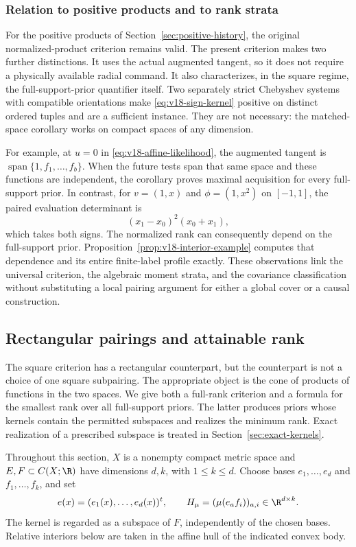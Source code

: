 \subsubsection{Relation to positive products and to rank strata}
For the positive products of Section~\ref{sec:positive-history}, the
original normalized-product criterion remains valid. The present
criterion makes two further distinctions. It uses the actual augmented
tangent, so it does not require a physically available radial command.
It also characterizes, in the square regime, the full-support-prior
quantifier itself. Two separately strict Chebyshev systems with compatible
orientations make \eqref{eq:v18-sign-kernel} positive on distinct ordered
tuples and are a sufficient instance. They are not necessary: the
matched-space corollary works on compact spaces of any dimension.

For example, at $u=0$ in \eqref{eq:v18-affine-likelihood}, the augmented
tangent is $\operatorname{span}\{1,f_1,\ldots,f_b\}$. When the future
tests span that same space and these functions are independent, the
corollary proves maximal acquisition for every full-support prior.
In contrast, for $v=(1,x)$ and $\phi=(1,x^2)$ on $[-1,1]$, the paired
evaluation determinant is
\[
 (x_1-x_0)^2(x_0+x_1),
\]
which takes both signs. The normalized rank can consequently depend on
the full-support prior. Proposition~\ref{prop:v18-interior-example}
computes that dependence and its entire finite-label profile exactly.
These observations link the universal criterion, the algebraic moment
strata, and the covariance classification without substituting a local
pairing argument for either a global cover or a causal construction.


\subsection{Rectangular pairings and attainable rank}
\label{sec:v19-rectangular}
The square criterion has a rectangular counterpart, but the counterpart
is not a choice of one square subpairing. The appropriate object is
the cone of products of functions in the two spaces. We give both a
full-rank criterion and a formula for the smallest rank over all
full-support priors. The latter produces priors whose kernels contain the permitted
subspaces and realizes the minimum rank. Exact realization of a prescribed
subspace is treated in Section~\ref{sec:exact-kernels}.

Throughout this section, $X$ is a nonempty compact metric space and
$E,F\subset C(X;\R)$ have dimensions $d,k$, with $1\le k\le d$.
Choose bases $e_1,\ldots,e_d$ and $f_1,\ldots,f_k$, and set
\[
 e(x)=(e_1(x),\ldots,e_d(x))^t,\qquad
 H_\mu=(\mu(e_a f_i))_{a,i}\in\R^{d\times k}.
\]
The kernel is regarded as a subspace of $F$, independently of the chosen
bases. Relative interiors below are taken in the affine hull of the
indicated convex body.

